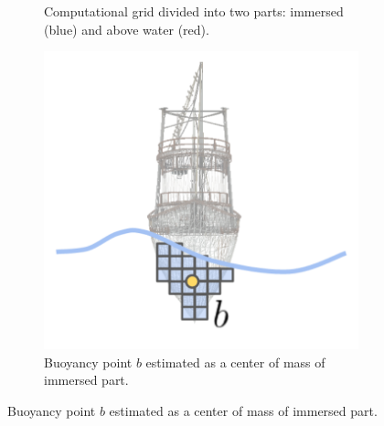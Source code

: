 \documentclass{report}
\begin{document}
\begin{figure}[htb]
\begin{subfigure}{0.25\textwidth}
  \caption{Computational grid divided into two parts: immersed (blue) and above water (red).}
  \label{fig:ship_algo_2}
\end{subfigure}\hfil %
\begin{subfigure}{0.25\textwidth}
  \includegraphics[width=\linewidth]{images/ship_algo_3.pdf}
  \caption{Buoyancy point $b$ estimated as a center of mass of immersed part.}
  \label{fig:ship_algo_3}
\end{subfigure}


\end{figure}
\end{document}
